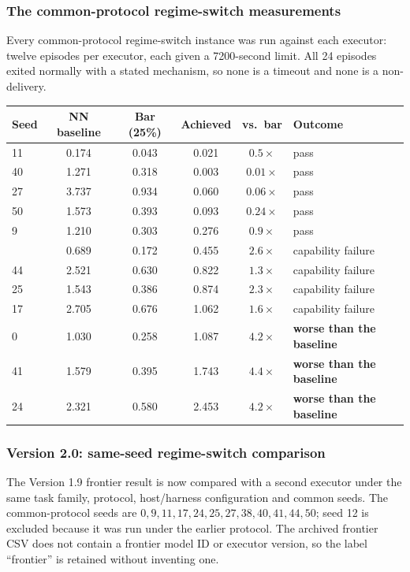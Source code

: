 \documentclass[11pt]{article}
\theoremstyle{definition}
\begin{document}
\subsubsection{The common-protocol regime-switch measurements}

Every common-protocol regime-switch instance was run against each executor: twelve episodes per executor, each given a 7200-second limit. All 24 episodes exited normally with a stated mechanism, so none is a timeout and none is a non-delivery.

\begin{table}[h]
\centering\small
\begin{tabularx}{\textwidth}{@{}lccccY@{}}
\toprule
Seed & NN baseline & Bar (25\%) & Achieved & vs.\ bar & Outcome \\
 & 0.174 & 0.043 & 0.021 & $0.5\times$ & pass \\
40 & 1.271 & 0.318 & 0.003 & $0.01\times$ & pass \\
27 & 3.737 & 0.934 & 0.060 & $0.06\times$ & pass \\
50 & 1.573 & 0.393 & 0.093 & $0.24\times$ & pass \\
9  & 1.210 & 0.303 & 0.276 & $0.9\times$ & pass \\
 & 0.689 & 0.172 & 0.455 & $2.6\times$ & capability failure \\
44 & 2.521 & 0.630 & 0.822 & $1.3\times$ & capability failure \\
25 & 1.543 & 0.386 & 0.874 & $2.3\times$ & capability failure \\
17 & 2.705 & 0.676 & 1.062 & $1.6\times$ & capability failure \\
0  & 1.030 & 0.258 & 1.087 & $4.2\times$ & \textbf{worse than the baseline} \\
41 & 1.579 & 0.395 & 1.743 & $4.4\times$ & \textbf{worse than the baseline} \\
24 & 2.321 & 0.580 & 2.453 & $4.2\times$ & \textbf{worse than the baseline} \\
\bottomrule
\end{tabularx}
\end{table}

\subsubsection{Version 2.0: same-seed regime-switch comparison}
The Version 1.9 frontier result is now compared with a second executor under the same
task family, protocol, host/harness configuration and common seeds. The common-protocol
seeds are $0,9,11,17,24,25,27,38,40,41,44,50$; seed 12 is excluded because it was run
under the earlier protocol. The archived frontier CSV does not contain a frontier model
ID or executor version, so the label ``frontier'' is retained without inventing one.
\end{document}
